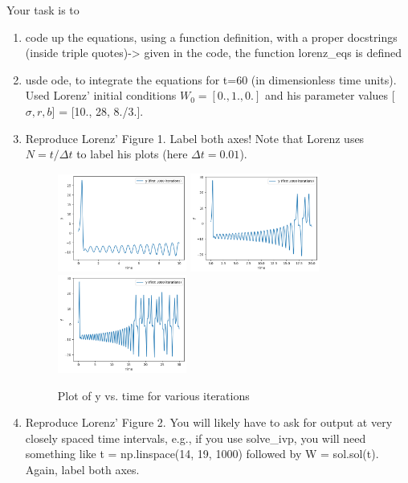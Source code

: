 \documentclass{article}
\begin{document}
Your task is to 
\begin{enumerate}
    \item code up the equations, using a function definition, with a proper docstrings (inside triple quotes)-> given in the code, the function lorenz\_eqs is defined
    \item usde ode, to integrate the equations for t=60 (in dimensionless time units). Used Lorenz' initial conditions $W_0=[0., 1., 0.]$ and his parameter values [$\sigma, r, b$] = [10., 28, 8./3.].
    \item Reproduce Lorenz' Figure 1. Label both axes! Note that Lorenz uses $N=t/\Delta t$ to label his plots (here $\Delta t=0.01$).
    \begin{figure}[!h]
\centering
    \includegraphics[width = 0.4\textwidth]{y1000.png}
    \includegraphics[width = 0.4\textwidth]{y2000.png}
    \includegraphics[width = 0.4\textwidth]{y3000.png}
    \caption{Plot of y vs. time for various iterations}
    \label{fig:2}
\end{figure}
    \item Reproduce Lorenz' Figure 2. You will likely have to ask for output at very closely spaced time intervals, e.g., if you use solve\_ivp, you will need something like t = np.linspace(14, 19, 1000) followed by W = sol.sol(t). Again, label both axes.

\end{enumerate}
\end{document}
